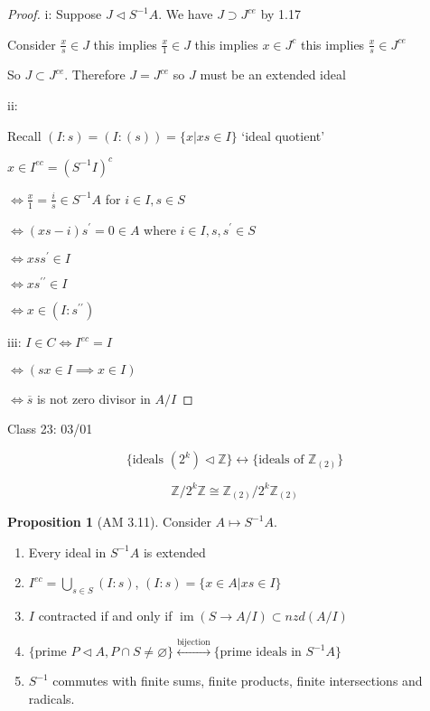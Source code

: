 \documentclass{article}
\theoremstyle{definition}
\newtheorem{proposition}{Proposition}
\newcommand{\im}{\operatorname{im}}
\begin{document}
\begin{proof}

    i: 
    Suppose \(J \triangleleft S ^{-1} A\). We have \(J \supset J^{ce} \) by 1.17

    Consider \(\frac{x}{s}\in J\) this implies \(\frac{x}{1}\in J\) this implies \(x\in J^c\) this implies \(\frac{x}{s}\in J^{ce}\)
    
    So \(J \subset J^{ce}\). Therefore \(J = J^{ce} \) so \(J\) must be an extended ideal

    ii:

    Recall \((I:s)=(I:(s))=\{ x | xs \in I \} \) `ideal quotient'

    \(x\in I^{ec} = (S ^{-1} I)^c\)
    
    \(\iff \frac{x}{1} = \frac{i}{s} \in S ^{-1} A\) for \(i\in I, s \in S\) 

    \(\iff (xs-i)s^{\prime} = 0\in A\) where \(i\in I, s,s^{\prime} \in S\) 

    \(\iff xss^{\prime} \in I\)
    
    \(\iff xs^{\prime\prime} \in I\) 

    \(\iff x\in (I:s^{\prime\prime} )\) 

    iii: \(I\in C \iff I^{ec} = I\) 

    \(\iff (sx\in I \implies x\in I)\)
    
    \(\iff \overline{s}\) is not zero divisor in \(A / I\) 

\end{proof}

\hrulefill

Class 23: 03/01

\[
    \{ \text{ideals } (2^k) \triangleleft \mathbb{Z}  \} \longleftrightarrow \{ \text{ideals of } \mathbb{Z} _{(2)} \} 
\]

\[
    \mathbb{Z} / 2^k \mathbb{Z} \cong \mathbb{Z}_{(2)} / 2^k\mathbb{Z} _{(2)}
\]

\begin{proposition}[AM 3.11]
    Consider \(A \mapsto S ^{-1} A\).

    \begin{enumerate}
        [label=\roman*]

        \item Every ideal in \(S ^{-1} A\) is extended
        \item \(I^{ec} = \bigcup_{s\in S} (I:s)\), \((I:s) = \{ x\in A | xs\in I \} \) 
        \item \(I\) contracted if and only if \(\im (S \to A / I) \subset nzd(A / I)\) 
        \item \(\{ \text{prime } P \triangleleft A, P\cap S\neq \varnothing \} \overset{\text{bijection} }{\longleftrightarrow} \{ \text{prime ideals in } S ^{-1} A \} \) 
        \item \(S ^{-1} \) commutes with finite sums, finite products, finite intersections and radicals.

    \end{enumerate}

\end{proposition}
\end{document}
